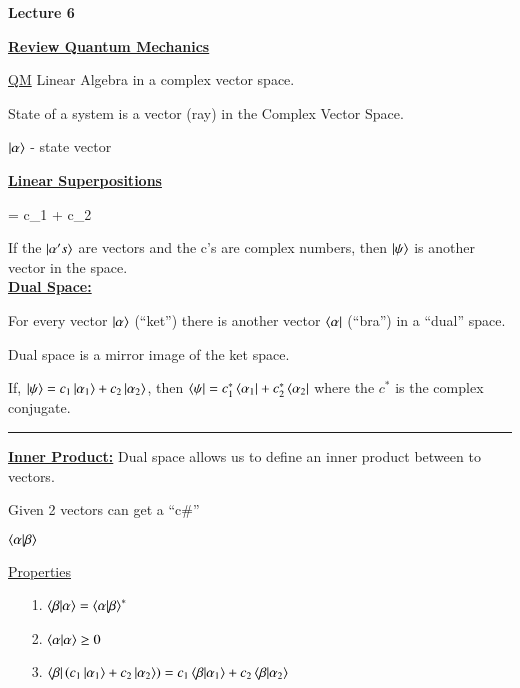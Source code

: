 
\usepackage{fancyhdr}

\fancyhf{}


\thispagestyle{fancy}

\begin{center}
{\huge \textbf{Lecture 6}}
\end{center}

{\fontsize{14}{16}\selectfont

\textbf{\underline{Review Quantum Mechanics}} 

\underline{QM} Linear Algebra in a complex vector space.

State of a system is a vector (ray) in the Complex Vector Space. 

\begin{center}
$\ket \alpha$  - state vector
\end{center}


\textbf{\underline{Linear Superpositions} }

\be
\ket \psi = c_1  + c_2 
\ee

If the $\ket{\alpha's}$ are vectors and the c's are complex numbers, then $\ket \psi$ is another vector in the space.\\


\textbf{\underline{Dual Space:}}

For every vector $\ket \alpha$ (``ket'') there is another vector $\bra \alpha$ (``bra'') in a ``dual'' space.

Dual space is a mirror image  of the ket space.


If, $\ket \psi = c_1 \ket{\alpha_1} + c_2 \ket{\alpha_2}$, then $\bra \psi = c_1^* \bra{\alpha_1} + c_2^* \bra{\alpha_2}$
where the $c^*$ is the complex conjugate.

\noindent\rule{\textwidth}{1pt}

\textbf{\underline{Inner Product:}} Dual space allows us to define an inner product between to vectors. 

Given 2 vectors can get a ``c\#'' 

$\braket{\alpha|\beta}$

\underline{Properties}
\begin{itemize}
\item[1.] $\braket{\beta|\alpha} = \braket{\alpha| \beta}^*$
\item[2.] $\braket{\alpha|\alpha} \geq 0$
\item[3.] $\bra{\beta} (c_1 \ket{\alpha_1} + c_2 \ket{\alpha_2} ) =  c_1 \braket{\beta|\alpha_1} + c_2 \braket{\beta| \alpha_2}$
\end{itemize}

}
